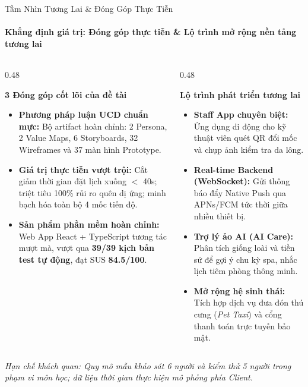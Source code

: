 \begin{frame}{Tầm Nhìn Tương Lai \& Đóng Góp Thực Tiễn}
  \framesubtitle{\color{PetcareSecondary}\textbf{Khẳng định giá trị: Đóng góp thực tiễn \& Lộ trình mở rộng nền tảng tương lai}}

  \begin{columns}[T]
    \begin{column}{0.48\textwidth}
      \begin{block}{\footnotesize \textbf{3 Đóng góp cốt lõi của đề tài}}
        \scriptsize
        \begin{itemize}
          \setlength\itemsep{1mm}
          \item \textbf{Phương pháp luận UCD chuẩn mực:} Bộ artifact hoàn chỉnh: 2 Persona, 2 Value Maps, 6 Storyboards, 32 Wireframes và 37 màn hình Prototype.
          \item \textbf{Giá trị thực tiễn vượt trội:} Cắt giảm thời gian đặt lịch xuống $<$ 40s; triệt tiêu 100\% rủi ro quên dị ứng; minh bạch hóa toàn bộ 4 mốc tiến độ.
          \item \textbf{Sản phẩm phần mềm hoàn chỉnh:} Web App React + TypeScript tương tác mượt mà, vượt qua \textbf{39/39 kịch bản test tự động}, đạt SUS \textbf{84.5/100}.
        \end{itemize}
      \end{block}
    \end{column}

    \begin{column}{0.48\textwidth}
      \begin{exampleblock}{\footnotesize \textbf{Lộ trình phát triển tương lai}}
        \scriptsize
        \begin{itemize}
          \setlength\itemsep{1mm}
          \item \textbf{Staff App chuyên biệt:} Ứng dụng di động cho kỹ thuật viên quét QR đổi mốc và chụp ảnh kiểm tra da lông.
          \item \textbf{Real-time Backend (WebSocket):} Gửi thông báo đẩy Native Push qua APNs/FCM tức thời giữa nhiều thiết bị.
          \item \textbf{Trợ lý ảo AI (AI Care):} Phân tích giống loài và tiền sử để gợi ý chu kỳ spa, nhắc lịch tiêm phòng thông minh.
          \item \textbf{Mở rộng hệ sinh thái:} Tích hợp dịch vụ đưa đón thú cưng (\textit{Pet Taxi}) và cổng thanh toán trực tuyến bảo mật.
        \end{itemize}
      \end{exampleblock}
    \end{column}
  \end{columns}

  \vspace{1mm}
  \begin{center}
    \scriptsize \color{gray}
    \textit{Hạn chế khách quan: Quy mô mẫu khảo sát 6 người và kiểm thử 5 người trong phạm vi môn học; dữ liệu thời gian thực hiện mô phỏng phía Client.}
  \end{center}
\end{frame}
